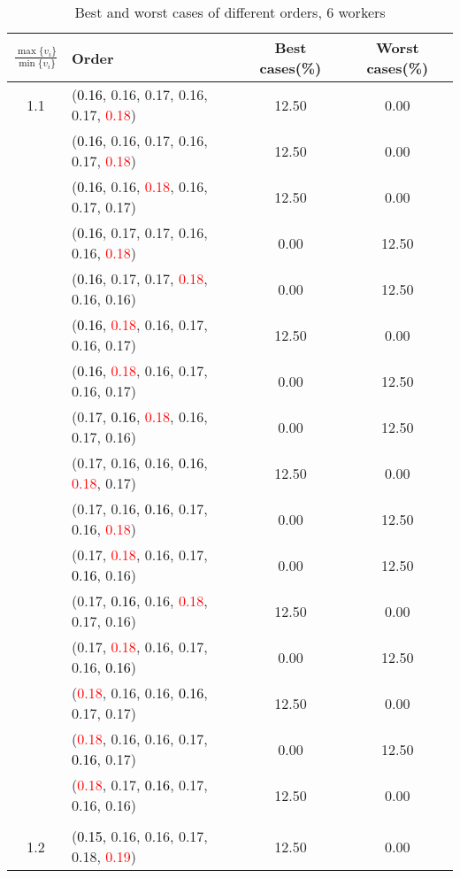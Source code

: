 \documentclass[10pt,a4paper]{report}
\begin{document}
\newpage\begin{center}
	\small
	\begin{longtable}{clcc}
		\caption{Best and worst cases of different orders, 6 workers}\\
		\toprule
		\setlength{\tabcolsep}{1mm}
		\renewcommand\baselinestretch{0.5}\selectfont
		$\frac{\max\{v_i\}}{\min\{v_i\}}$ & Order & Best cases(\%) & Worst cases(\%) \\
			\midrule		1.1			&(\textcolor{black}{0.16}, 0.16, 0.17, 0.16, 0.17, \textcolor{red}{0.18})&12.50&0.00\\
			&(\textcolor{black}{0.16}, 0.16, 0.17, 0.16, 0.17, \textcolor{red}{0.18})&12.50&0.00\\
			&(\textcolor{black}{0.16}, 0.16, \textcolor{red}{0.18}, 0.16, 0.17, 0.17)&12.50&0.00\\
			&(\textcolor{black}{0.16}, 0.17, 0.17, 0.16, 0.16, \textcolor{red}{0.18})&0.00&12.50\\
			&(\textcolor{black}{0.16}, 0.17, 0.17, \textcolor{red}{0.18}, 0.16, 0.16)&0.00&12.50\\
			&(\textcolor{black}{0.16}, \textcolor{red}{0.18}, 0.16, 0.17, 0.16, 0.17)&12.50&0.00\\
			&(\textcolor{black}{0.16}, \textcolor{red}{0.18}, 0.16, 0.17, 0.16, 0.17)&0.00&12.50\\
			&(0.17, \textcolor{black}{0.16}, \textcolor{red}{0.18}, 0.16, 0.17, 0.16)&0.00&12.50\\
			&(0.17, 0.16, 0.16, \textcolor{black}{0.16}, \textcolor{red}{0.18}, 0.17)&12.50&0.00\\
			&(0.17, 0.16, \textcolor{black}{0.16}, 0.17, 0.16, \textcolor{red}{0.18})&0.00&12.50\\
			&(0.17, \textcolor{red}{0.18}, 0.16, 0.17, \textcolor{black}{0.16}, 0.16)&0.00&12.50\\
			&(0.17, \textcolor{black}{0.16}, 0.16, \textcolor{red}{0.18}, 0.17, 0.16)&12.50&0.00\\
			&(0.17, \textcolor{red}{0.18}, 0.16, 0.17, 0.16, \textcolor{black}{0.16})&0.00&12.50\\
			&(\textcolor{red}{0.18}, 0.16, 0.16, \textcolor{black}{0.16}, 0.17, 0.17)&12.50&0.00\\
			&(\textcolor{red}{0.18}, 0.16, 0.16, 0.17, \textcolor{black}{0.16}, 0.17)&0.00&12.50\\
			&(\textcolor{red}{0.18}, 0.17, \textcolor{black}{0.16}, 0.17, 0.16, 0.16)&12.50&0.00\\
		&&&\\
		1.2			&(\textcolor{black}{0.15}, 0.16, 0.16, 0.17, 0.18, \textcolor{red}{0.19})&12.50&0.00\\

\end{longtable}
\end{center}
\end{document}
